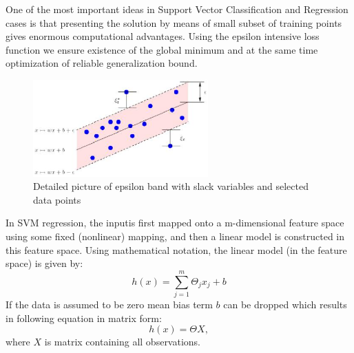One of the most important ideas in Support Vector Classification and Regression cases is 
that presenting the solution by means of small subset of training points gives enormous 
computational advantages. 
Using the epsilon intensive loss function we ensure existence of the global minimum and at 
the same time optimization of reliable generalization bound.
\begin{figure}[htb] 
	\label{fig:epsilon_band}
	\centering
	\includegraphics[width=0.6\textwidth]{figures/epsilon_band}
	\caption{Detailed picture of epsilon band with slack variables and selected data points}
\end{figure}
In SVM regression, the inputis first mapped onto a m-dimensional feature space using some 
fixed (nonlinear) mapping, and then a linear model is constructed in this feature space. 
Using mathematical notation, the linear model (in the feature space) is given by:
\begin{equation}
	\label{equ:svm_in}
	h(x) = \sum_{j=1}^{m}\Theta_{j}x_{j} + b
\end{equation}
If the data is assumed to be zero mean bias term $b$ can be dropped which results in following
equation in matrix form:
\begin{equation}
	\label{equ:svm_in_matrix}
	h(x) = \Theta X,
\end{equation}
where $X$ is matrix containing all observations.

